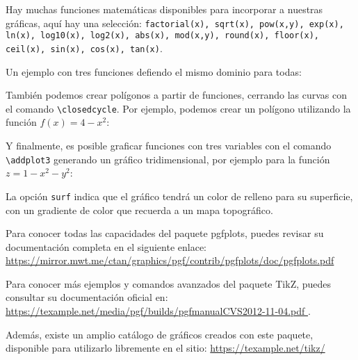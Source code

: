 \documentclass[12pt,letterpaper]{article}
\begin{document}
Hay muchas funciones matemáticas disponibles para incorporar a nuestras gráficas, aquí hay una selección: \texttt{factorial(x), sqrt(x), pow(x,y), exp(x), ln(x), log10(x), log2(x), abs(x), mod(x,y), round(x), floor(x), ceil(x), sin(x), cos(x), tan(x)}. 

Un ejemplo con tres funciones defiendo el mismo dominio para todas:


También podemos crear polígonos a partir de funciones, cerrando las curvas con el comando \texttt{\textbackslash closedcycle}. Por ejemplo, podemos crear un polígono utilizando la función $f(x) = 4-x^2$:


Y finalmente, es posible graficar funciones con tres variables con el comando \texttt{\textbackslash addplot3} generando un gráfico tridimensional, por ejemplo para la función $z = 1-x^2-y^2$:


La opción \texttt{surf} indica que el gráfico tendrá un color de relleno para su superficie, con un gradiente de color que recuerda a un mapa topográfico.

Para conocer todas las capacidades del paquete pgfplots, puedes revisar su documentación completa en el siguiente enlace: \url{https://mirror.mwt.me/ctan/graphics/pgf/contrib/pgfplots/doc/pgfplots.pdf}

Para conocer más ejemplos y comandos avanzados del paquete TikZ, puedes consultar su documentación oficial en: \url{https://texample.net/media/pgf/builds/pgfmanualCVS2012-11-04.pdf }.

Además, existe un amplio catálogo de gráficos creados con este paquete, disponible para utilizarlo libremente en el sitio: \url{https://texample.net/tikz/}
\end{document}
